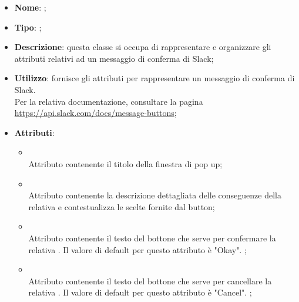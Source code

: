 \begin{itemize}
	\item \textbf{Nome}: ;
	\item \textbf{Tipo}: ;
	\item \textbf{Descrizione}: questa classe si occupa di rappresentare e organizzare gli attributi relativi ad un messaggio di conferma di Slack;
	\item \textbf{Utilizzo}: fornisce gli attributi per rappresentare un messaggio di conferma di Slack.
\\
Per la relativa documentazione, consultare la pagina \url{https://api.slack.com/docs/message-buttons};
	\item \textbf{Attributi}:
	\begin{itemize}
		\item[]  \\
		Attributo contenente il titolo della finestra di pop up;
		\item[]  \\
		Attributo contenente la descrizione dettagliata delle conseguenze della relativa  e contestualizza le scelte fornite dal button;
		\item[]  \\
		Attributo contenente il testo del bottone che serve per confermare la relativa . Il valore di default per questo attributo è "Okay".
;
		\item[]  \\
		Attributo contenente il testo del bottone che serve per cancellare la relativa . Il valore di default per questo attributo è "Cancel". ;
	\end{itemize}
\end{itemize}

